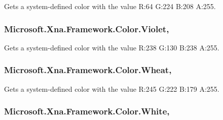 Gets a system-\/defined color with the value R\+:64 G\+:224 B\+:208 A\+:255.

\hypertarget{struct_microsoft_1_1_xna_1_1_framework_1_1_color_af59a0afe64a4809c55d9ccda1ba5c4ff}{}
\subsubsection[{Violet}]{ Microsoft.\+Xna.\+Framework.\+Color.\+Violet\hspace{0.3cm}{\ttfamily [static]}, {\ttfamily [get]}}\label{struct_microsoft_1_1_xna_1_1_framework_1_1_color_af59a0afe64a4809c55d9ccda1ba5c4ff}


Gets a system-\/defined color with the value R\+:238 G\+:130 B\+:238 A\+:255.

\hypertarget{struct_microsoft_1_1_xna_1_1_framework_1_1_color_a24ec13e7a204ec1c4f1697ff81483b4c}{}
\subsubsection[{Wheat}]{ Microsoft.\+Xna.\+Framework.\+Color.\+Wheat\hspace{0.3cm}{\ttfamily [static]}, {\ttfamily [get]}}\label{struct_microsoft_1_1_xna_1_1_framework_1_1_color_a24ec13e7a204ec1c4f1697ff81483b4c}


Gets a system-\/defined color with the value R\+:245 G\+:222 B\+:179 A\+:255.

\hypertarget{struct_microsoft_1_1_xna_1_1_framework_1_1_color_af56dccd04a51f0411a933a3662b7cec6}{}
\subsubsection[{White}]{ Microsoft.\+Xna.\+Framework.\+Color.\+White\hspace{0.3cm}{\ttfamily [static]}, {\ttfamily [get]}}\label{struct_microsoft_1_1_xna_1_1_framework_1_1_color_af56dccd04a51f0411a933a3662b7cec6}


